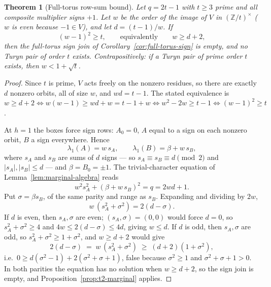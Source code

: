\documentclass[11pt]{article}
\theoremstyle{plain}
\newtheorem{theorem}{Theorem}[section]
\theoremstyle{definition}
\theoremstyle{remark}
\newcommand{\Z}{\mathbb Z}
\begin{document}
\begin{theorem}[Full-torus row-sum bound]\label{thm:full-torus-rowsum}
Let $q=2t-1$ with $t\ge3$ prime and all composite multiplier signs $+1$.
Let $w$ be the order of the image of $V$ in $(\Z/t)^\times$ ($w$ is even
because $-1\in V$), and let $d=(t-1)/w$.  If
\[
  (w-1)^2\ge t,\qquad\text{equivalently}\qquad w\ge d+2,
\]
then the full-torus sign join of Corollary~\ref{cor:full-torus-sign} is
empty, and no Turyn pair of order $t$ exists.  Contrapositively: if a
Turyn pair of prime order $t$ exists, then $w<1+\sqrt t$.
\end{theorem}

\begin{proof}
Since $t$ is prime, $V$ acts freely on the nonzero residues, so there are
exactly $d$ nonzero orbits, all of size $w$, and $wd=t-1$.  The stated
equivalence is
$w\ge d+2\iff w(w-1)\ge wd+w=t-1+w\iff w^2-2w\ge t-1\iff(w-1)^2\ge t$.

At $h=1$ the boxes force sign rows: $A_0=0$, $A$ equal to a sign on each
nonzero orbit, $B$ a sign everywhere.  Hence
\[
  \lambda_1(A)=w\,s_A,\qquad
  \lambda_1(B)=\beta+w\,s_B,
\]
where $s_A$ and $s_B$ are sums of $d$ signs --- so
$s_A\equiv s_B\equiv d\pmod2$ and $|s_A|,|s_B|\le d$ --- and
$\beta=B_0=\pm1$.  The trivial-character equation of
Lemma~\ref{lem:marginal-algebra} reads
\[
  w^2s_A^2+(\beta+w\,s_B)^2=q=2wd+1 .
\]
Put $\sigma=\beta s_B$, of the same parity and range as $s_B$.  Expanding
and dividing by $2w$,
\[
  w\,(s_A^2+\sigma^2)=2(d-\sigma).
\]
If $d$ is even, then $s_A,\sigma$ are even; $(s_A,\sigma)=(0,0)$ would
force $d=0$, so $s_A^2+\sigma^2\ge4$ and
$4w\le2(d-\sigma)\le4d$, giving $w\le d$.  If $d$ is odd, then
$s_A,\sigma$ are odd, so $s_A^2+\sigma^2\ge1+\sigma^2$, and $w\ge d+2$
would give
\[
  2(d-\sigma)\;=\;w\,(s_A^2+\sigma^2)\;\ge\;(d+2)(1+\sigma^2),
\]
i.e.\ $0\ge d(\sigma^2-1)+2(\sigma^2+\sigma+1)$, false because
$\sigma^2\ge1$ and $\sigma^2+\sigma+1>0$.  In both parities the equation
has no solution when $w\ge d+2$, so the sign join is empty, and
Proposition~\ref{prop:t2-marginal} applies.
\end{proof}
\end{document}
